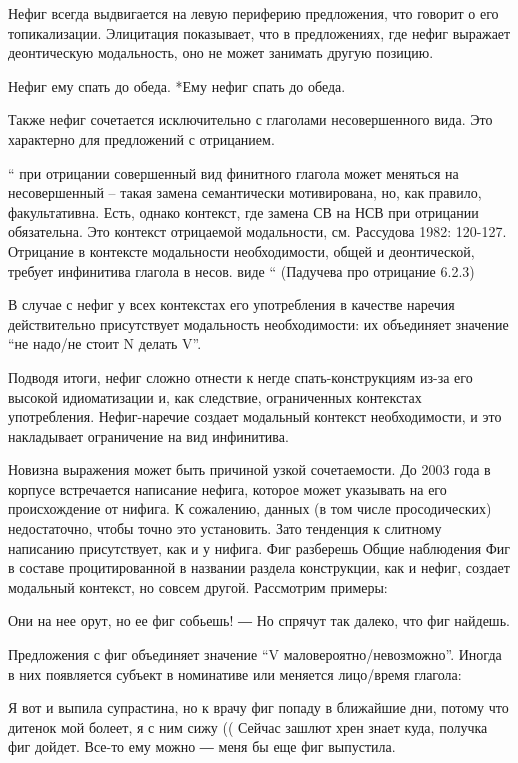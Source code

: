 \documentclass{article}
\begin{document}
Нефиг всегда выдвигается на левую периферию предложения, что говорит о его топикализации. Элицитация показывает, что в предложениях, где нефиг выражает деонтическую модальность, оно не может занимать другую позицию. 

Нефиг ему спать до обеда.
*Ему нефиг спать до обеда.

Также нефиг сочетается исключительно с глаголами несовершенного вида. Это характерно для предложений с отрицанием. 

“
при отрицании совершенный вид финитного глагола может меняться на несовершенный – такая замена семантически мотивирована, но, как правило, факультативна. Есть, однако контекст, где замена СВ на НСВ при отрицании обязательна. Это контекст отрицаемой модальности, см. Рассудова 1982: 120-127.
Отрицание в контексте модальности необходимости, общей и деонтической, требует инфинитива глагола в несов. виде
“
(Падучева про отрицание 6.2.3)

В случае с нефиг у всех контекстах его употребления в качестве наречия действительно присутствует модальность необходимости: их объединяет значение “не надо/не стоит N делать V”.

Подводя итоги, нефиг сложно отнести к негде спать-конструкциям из-за его высокой идиоматизации и, как следствие, ограниченных контекстах употребления. Нефиг-наречие создает модальный контекст необходимости, и это накладывает ограничение на вид инфинитива.

Новизна выражения может быть причиной узкой сочетаемости. До 2003 года в корпусе встречается написание нефига, которое может указывать на его происхождение от нифига. К сожалению, данных (в том числе просодических) недостаточно, чтобы точно это установить. Зато тенденция к слитному написанию присутствует, как и у нифига.
Фиг разберешь
Общие наблюдения
Фиг в составе процитированной в названии раздела конструкции, как и нефиг, создает модальный контекст, но совсем другой. Рассмотрим примеры:

Они на нее орут, но ее фиг собьешь! 
 ― Но спрячут так далеко, что фиг найдешь. 

Предложения с фиг объединяет значение “V маловероятно/невозможно”. Иногда в них появляется субъект в номинативе или меняется лицо/время глагола:

Я вот и выпила супрастина, но к врачу фиг попаду в ближайшие дни, потому что дитенок мой болеет, я с ним сижу ((
Сейчас зашлют хрен знает куда, получка фиг дойдет. 
Все-то ему можно ― меня бы еще фиг выпустила. 
\end{document}
